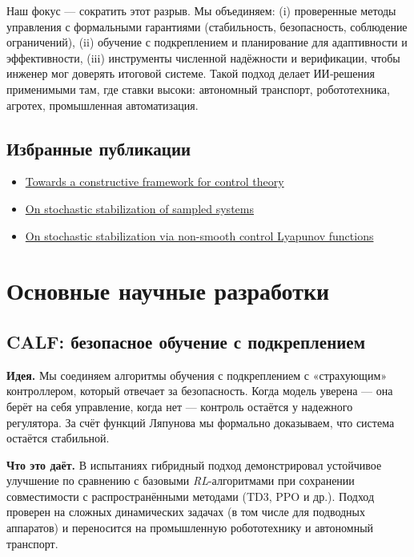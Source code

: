 \documentclass[12pt,a4paper]{article}
\begin{document}
Наш фокус — сократить этот разрыв. Мы объединяем: (i) проверенные методы управления с формальными гарантиями (стабильность, безопасность, соблюдение ограничений), (ii) обучение с подкреплением и планирование для адаптивности и эффективности, (iii) инструменты численной надёжности и верификации, чтобы инженер мог доверять итоговой системе. Такой подход делает ИИ‑решения применимыми там, где ставки высоки: автономный транспорт, робототехника, агротех, промышленная автоматизация.

\subsection*{Избранные публикации}
\begin{itemize}
    \item \href{https://arxiv.org/abs/2501.02267}{Towards a constructive framework for control theory}
    \item \href{https://arxiv.org/abs/2105.07152}{On stochastic stabilization of sampled systems}
    \item \href{https://arxiv.org/abs/2205.13409}{On stochastic stabilization via non-smooth control Lyapunov functions}
\end{itemize}

\section{Основные научные разработки}
\subsection{CALF: безопасное обучение с подкреплением}
\textbf{Идея.} Мы соединяем алгоритмы обучения с подкреплением с «страхующим» контроллером, который отвечает за безопасность. Когда модель уверена — она берёт на себя управление, когда нет — контроль остаётся у надежного регулятора. За счёт функций Ляпунова мы формально доказываем, что система остаётся стабильной.

\textbf{Что это даёт.} В испытаниях гибридный подход демонстрировал устойчивое улучшение по сравнению с базовыми \textit{RL}-алгоритмами при сохранении совместимости с распространёнными методами (TD3, PPO и др.). Подход проверен на сложных динамических задачах (в том числе для подводных аппаратов) и переносится на промышленную робототехнику и автономный транспорт.
\end{document}

